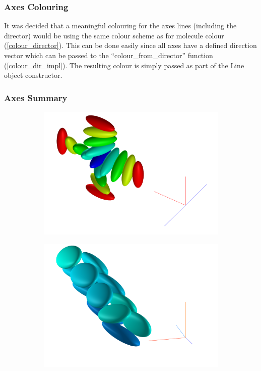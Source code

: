 \subsubsection{Axes Colouring}
It was decided that a meaningful colouring for the axes lines (including the director) would be using the same colour scheme as for molecule colour (\cref{colour_director}). This can be done easily since all axes have a defined direction vector which can be passed to the ``colour\_from\_director'' function (\cref{colour_dir_impl}). The resulting colour is simply passed as part of the Line object constructor.

\subsubsection{Axes Summary}
\begin{figure}
  \begin{center}
    \begin{subfigure}{0.4\textwidth}
      \includegraphics[width=\linewidth]{assets/images/axes/2_new_1}
      \caption{}
      \label{fig:2_new_1}
    \end{subfigure}
    \begin{subfigure}{0.4\textwidth}
      \includegraphics[width=\linewidth]{assets/images/axes/2_new_2}

\end{subfigure}
\end{center}
\end{figure}
